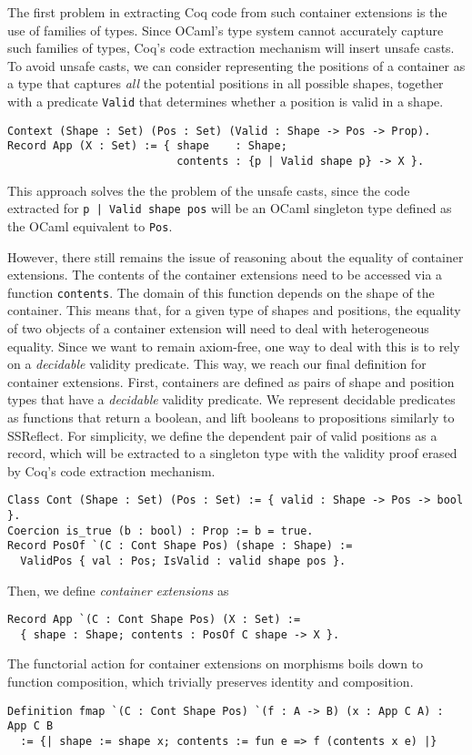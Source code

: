 \documentclass[a4paper, UKenglish, cleveref, autoref, thm-restate]{lipics-v2021}
\begin{document}
The first problem in extracting Coq code from such container extensions is the
use of families of types. Since OCaml's type system cannot accurately capture
such families of types, Coq's code extraction mechanism will insert unsafe
casts. To avoid unsafe casts, we can consider representing the positions of a
container as a type that captures \emph{all} the potential positions in all
possible shapes, together with a predicate \texttt{Valid} that
determines whether a position is valid in a shape. 
\begin{verbatim}
Context (Shape : Set) (Pos : Set) (Valid : Shape -> Pos -> Prop).
Record App (X : Set) := { shape    : Shape; 
                          contents : {p | Valid shape p} -> X }.
\end{verbatim}
This approach solves the the problem of the unsafe casts, since the code
extracted for \texttt{{p | Valid shape pos}} will be an OCaml
singleton type defined as the OCaml equivalent to \texttt{Pos}.

However, there still remains the issue of reasoning about the equality of
container extensions. The contents of the container extensions need to be
accessed via a function \texttt{contents}. The domain of this function
depends on the shape of the container. This means that, for a given type of
shapes and positions, the equality of two objects of a container extension will
need to deal with heterogeneous equality. Since we want to remain axiom-free,
one way to deal with this is to rely on a \emph{decidable} validity predicate.
This way, we reach our final definition for container extensions. First,
containers are defined as pairs of shape and position types that have a
\emph{decidable} validity predicate. We represent decidable predicates as
functions that return a boolean, and lift booleans to propositions similarly to
SSReflect. For simplicity, we define the dependent pair of valid positions as a
record, which will be extracted to a singleton type with the validity proof
erased by Coq's code extraction mechanism.
\begin{verbatim}
Class Cont (Shape : Set) (Pos : Set) := { valid : Shape -> Pos -> bool }.
Coercion is_true (b : bool) : Prop := b = true.
Record PosOf `(C : Cont Shape Pos) (shape : Shape) := 
  ValidPos { val : Pos; IsValid : valid shape pos }.
\end{verbatim}
Then, we define \emph{container extensions} as
\begin{verbatim}
Record App `(C : Cont Shape Pos) (X : Set) :=
  { shape : Shape; contents : PosOf C shape -> X }.
\end{verbatim}
The functorial action for container extensions on morphisms boils down to
function composition, which trivially preserves identity and composition.
\begin{verbatim}
Definition fmap `(C : Cont Shape Pos) `(f : A -> B) (x : App C A) : App C B
  := {| shape := shape x; contents := fun e => f (contents x e) |}
\end{verbatim}
\end{document}
